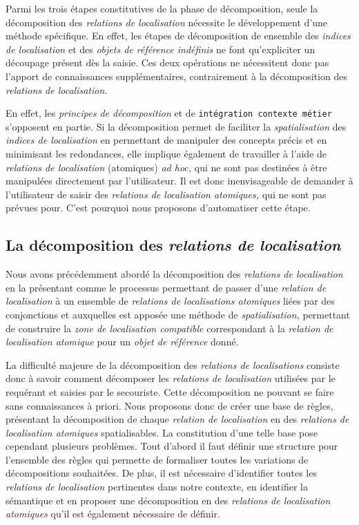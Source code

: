 Parmi les trois étapes constitutives de la phase de décomposition,
seule la décomposition des \emph{relations de localisation} nécessite
le développement d'une méthode spécifique. En effet, les étapes de
décomposition de ensemble des \emph{indices de localisation} et des
\emph{objets de référence indéfinis} ne font qu'expliciter un
découpage présent dès la saisie. Ces deux opérations ne nécessitent
donc pas l'apport de connaissances supplémentaires, contrairement à la
décomposition des \emph{relations de localisation.}

En effet, les \emph{principes de décomposition} et de
\texttt{intégration contexte métier} s'opposent en partie. Si la
décomposition permet de faciliter la \emph{spatialisation} des
\emph{indices de localisation} en permettant de manipuler des concepts
précis et en minimisant les redondances, elle implique également de
travailler à l'aide de \emph{relations de localisation} (atomiques)
\emph{ad hoc,} qui ne sont pas destinées à être manipulées directement
par l'utilisateur. Il est donc inenvisageable de demander à
l'utilisateur de saisir des \emph{relations de localisation
  atomiques,} qui ne sont pas prévues pour. C'est pourquoi nous
proposons d'automatiser cette étape.

\subsection{La décomposition des \emph{relations de localisation}}

Nous avons précédemment abordé la décomposition des \emph{relations de
  localisation} en la présentant comme le processus permettant de
passer d'une \emph{relation de localisation} à un ensemble de
\emph{relations de localisations atomiques} liées par des conjonctions
et auxquelles est apposée une méthode de \emph{spatialisation,}
permettant de construire la \emph{zone de localisation compatible}
correspondant à la \emph{relation de localisation atomique} pour un
\emph{objet de référence} donné.

La difficulté majeure de la décomposition des \emph{relations de
  localisations} consiste donc à savoir comment décomposer les
\emph{relations de localisation} utilisées par le requérant et saisies
par le secouriste. Cette décomposition ne pouvant se faire sans
connaissances à priori. Nous proposons donc de créer une base de
règles, présentant la décomposition de chaque \emph{relation de
  localisation} en des \emph{relations de localisation atomiques}
spatialisables. La constitution d'une telle base pose cependant
plusieurs problèmes. Tout d'abord il faut définir une structure pour
l'ensemble des règles qui permette de formaliser toutes les variations
de décompositions souhaitées. De plus, il est nécessaire d'identifier
toutes les \emph{relations de localisation} pertinentes dans notre
contexte, en identifier la sémantique et en proposer une décomposition
en des \emph{relations de localisation atomiques} qu'il est également
nécessaire de définir.

